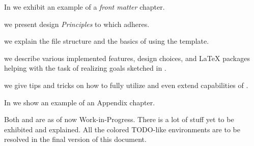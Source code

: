  \label{ch:Quick Summary}

\vspace{2ex} %


In \textbf{} we exhibit an example of a \emph{front matter} chapter.

 we present design \emph{Principles} to which \TeXtured{} adheres.

 we explain the file structure and the basics of using the template.

 we describe various implemented features, design choices, and \LaTeX{} packages helping with the task of realizing goals sketched in .

 we give tips and tricks on how to fully utilize and even extend capabilities of \TeXtured{}.

In \textbf{} we show an example of an Appendix chapter.

\begin{Note}
    Both  and  are as of now Work-in-Progress.
    There is a lot of stuff yet to be exhibited and explained.
    All the colored \textsf{TODO}-like environments are to be resolved in the final version of this document.
\end{Note}
